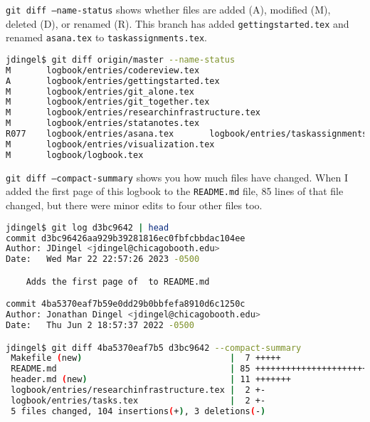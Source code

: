 \texttt{git diff --name-status} shows whether files are added (A), modified (M), deleted (D), or renamed (R).
This branch has added \texttt{gettingstarted.tex} and renamed \texttt{asana.tex} to \texttt{taskassignments.tex}.
\begin{lstlisting}[language=bash]
jdingel$ git diff origin/master --name-status
M       logbook/entries/codereview.tex
A       logbook/entries/gettingstarted.tex
M       logbook/entries/git_alone.tex
M       logbook/entries/git_together.tex
M       logbook/entries/researchinfrastructure.tex
M       logbook/entries/statanotes.tex
R077    logbook/entries/asana.tex       logbook/entries/taskassignments.tex
M       logbook/entries/visualization.tex
M       logbook/logbook.tex
\end{lstlisting}

\texttt{git diff --compact-summary} shows you how much files have changed.
When I added the first page of this logbook to the \texttt{README.md} file,
85 lines of that file changed, but there were minor edits to four other files too.
\begin{lstlisting}[language=bash]
jdingel$ git log d3bc9642 | head
commit d3bc96426aa929b39281816ec0fbfcbbdac104ee
Author: JDingel <jdingel@chicagobooth.edu>
Date:   Wed Mar 22 22:57:26 2023 -0500

    Adds the first page of  to README.md

commit 4ba5370eaf7b59e0dd29b0bbfefa8910d6c1250c
Author: Jonathan Dingel <jdingel@chicagobooth.edu>
Date:   Thu Jun 2 18:57:37 2022 -0500

jdingel$ git diff 4ba5370eaf7b5 d3bc9642 --compact-summary
 Makefile (new)                             |  7 +++++
 README.md                                  | 85 +++++++++++++++++++++++++++++++++++++++++++++++++-
 header.md (new)                            | 11 +++++++
 logbook/entries/researchinfrastructure.tex |  2 +-
 logbook/entries/tasks.tex                  |  2 +-
 5 files changed, 104 insertions(+), 3 deletions(-)
\end{lstlisting}